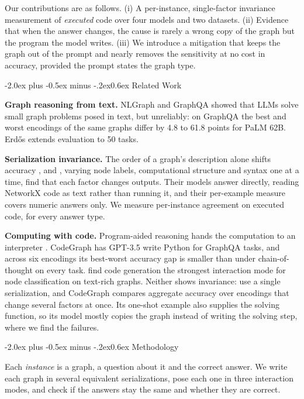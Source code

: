 \documentclass[11pt]{article}
\makeatletter
\renewcommand\section{\@startsection{section}{1}{\z@}
  {-2.0ex plus -0.5ex minus -.2ex}{0.6ex}
  {\large\bfseries\centering}}
\makeatother
\begin{document}
Our contributions are as follows. (i) A per-instance, single-factor invariance measurement of \emph{executed} code over four models and two datasets. (ii) Evidence that when the answer changes, the cause is rarely a wrong copy of the graph but the program the model writes. (iii) We introduce a mitigation that keeps the graph out of the prompt and nearly removes the sensitivity at no cost in accuracy, provided the prompt states the graph type.

\section{Related Work}

\textbf{Graph reasoning from text.} NLGraph \citep{wang} and GraphQA \citep{fatemi} showed that LLMs solve small graph problems posed in text, but unreliably: on GraphQA the best and worst encodings of the same graphs differ by 4.8 to 61.8 points for PaLM 62B. Erdős \citep{guo} extends evaluation to 50 tasks.

\textbf{Serialization invariance.} The order of a graph's description alone shifts accuracy \citep{ge}, and \citet{herbst}, varying node labels, computational structure and syntax one at a time, find that each factor changes outputs. Their models answer directly, reading NetworkX code as text rather than running it, and their per-example measure covers numeric answers only. We measure per-instance agreement on executed code, for every answer type.

\textbf{Computing with code.} Program-aided reasoning hands the computation to an interpreter \citep{gao}. CodeGraph \citep{cai} has GPT-3.5 write Python for GraphQA tasks, and across six encodings its best-worst accuracy gap is smaller than under chain-of-thought on every task. \citet{finkelshtein} find code generation the strongest interaction mode for node classification on text-rich graphs. Neither shows invariance: \citet{finkelshtein} use a single serialization, and CodeGraph compares aggregate accuracy over encodings that change several factors at once. Its one-shot example also supplies the solving function, so its model mostly copies the graph instead of writing the solving step, where we find the failures.

\section{Methodology}

Each \emph{instance} is a graph, a question about it and the correct answer. We write each graph in several equivalent serializations, pose each one in three interaction modes, and check if the answers stay the same and whether they are correct.
\end{document}
